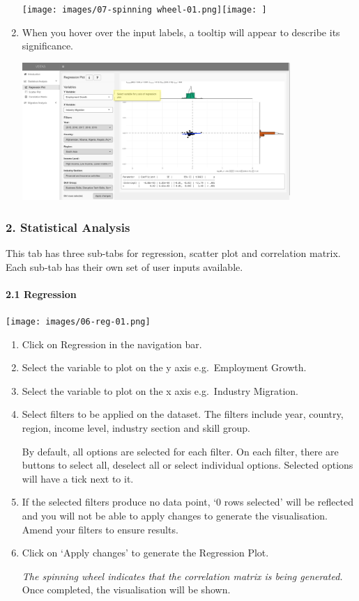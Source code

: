 \documentclass[
]{article}
\begin{document}
\begin{enumerate}
  \texttt{[image: images/07-spinning wheel-01.png]}\texttt{[image: ]}
\item
  When you hover over the input labels, a tooltip will appear to
  describe its significance.

  \includegraphics[width=0.8\textwidth,height=\textheight]{images/06-regression-input-tooltip.png}
\end{enumerate}

\hypertarget{statistical-analysis}{%
\subsubsection{2. Statistical Analysis}\label{statistical-analysis}}

This tab has three sub-tabs for regression, scatter plot and correlation
matrix. Each sub-tab has their own set of user inputs available.

\hypertarget{regression}{%
\paragraph{2.1 Regression}\label{regression}}

\texttt{[image: images/06-reg-01.png]}

\begin{enumerate}
\def\labelenumi{\arabic{enumi}.}
\item
  Click on Regression in the navigation bar.
\item
  Select the variable to plot on the y axis e.g.~Employment Growth.
\item
  Select the variable to plot on the x axis e.g.~Industry Migration.
\item
  Select filters to be applied on the dataset. The filters include year,
  country, region, income level, industry section and skill group.

  By default, all options are selected for each filter. On each filter,
  there are buttons to select all, deselect all or select individual
  options. Selected options will have a tick next to it.
\item
  If the selected filters produce no data point, `0 rows selected' will
  be reflected and you will not be able to apply changes to generate the
  visualisation. Amend your filters to ensure results.
\item
  Click on `Apply changes' to generate the Regression Plot.

  \emph{The spinning wheel indicates that the correlation matrix is
  being generated.} Once completed, the visualisation will be shown.
\end{enumerate}
\end{document}

